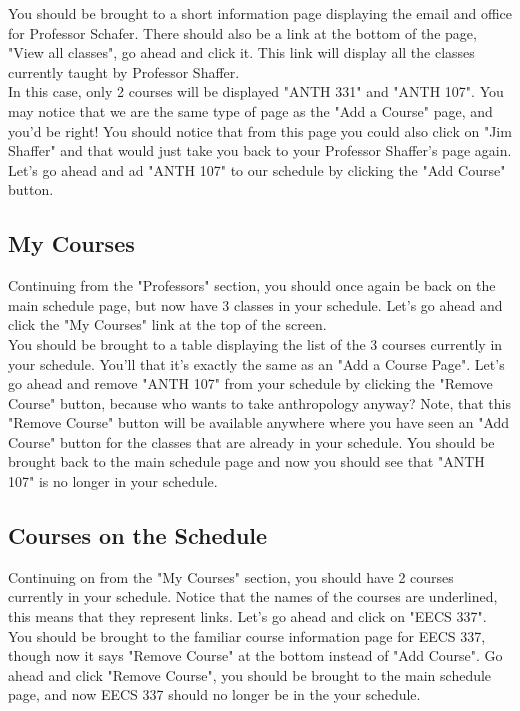 \documentclass[pdftex,12pt,letter]{article}
\begin{document}
You should be brought to a short information page displaying the email and office for Professor Schafer. There should also be a link at the bottom of the page, "View all classes", go ahead and click it. This link will display all the classes currently taught by Professor Shaffer.\\

In this case, only 2 courses will be displayed "ANTH 331" and "ANTH 107". You may notice that we are the same type of page as the "Add a Course" page, and you'd be right! You should notice that from this page you could also click on "Jim Shaffer" and that would just take you back to your Professor Shaffer's page again. Let's go ahead and ad "ANTH 107" to our schedule by clicking the "Add Course" button.\\

\subsection{My Courses}
Continuing from the "Professors" section, you should once again be back on the main schedule page, but now have 3 classes in your schedule. Let's go ahead and click the "My Courses" link at the top of the screen.\\

You should be brought to a table displaying the list of the 3 courses currently in your schedule. You'll that it's exactly the same as an "Add a Course Page". Let's go ahead and remove "ANTH 107" from your schedule by clicking the "Remove Course" button, because who wants to take anthropology anyway? Note, that this "Remove Course" button will be available anywhere where you have seen an "Add Course" button for the classes that are already in your schedule. You should be brought back to the main schedule page and now you should see that "ANTH 107" is no longer in your schedule.\\

\subsection{Courses on the Schedule}
Continuing on from the "My Courses" section, you should have 2 courses currently in your schedule. Notice that the names of the courses are underlined, this means that they represent links. Let's go ahead and click on "EECS 337". You should be brought to the familiar course information page for EECS 337, though now it says "Remove Course" at the bottom instead of "Add Course". Go ahead and click "Remove Course", you should be brought to the main schedule page, and now EECS 337 should no longer be in the your schedule.\\
\end{document}
